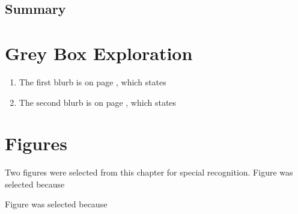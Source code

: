 \documentclass[12pt]{article}
\numberwithin{figure}{subsection}
\numberwithin{table}{subsection}
\numberwithin{equation}{subsection}
\begin{document}
\subsection{Summary}

\section{Grey Box Exploration}

\begin{enumerate}
  \item The first blurb is on page , which states \textit{}

  \item The second blurb is on page , which states \textit{}
\end{enumerate}

\section{Figures}

Two figures were selected from this chapter for special recognition. Figure was selected because


Figure was selected because


\end{document}
